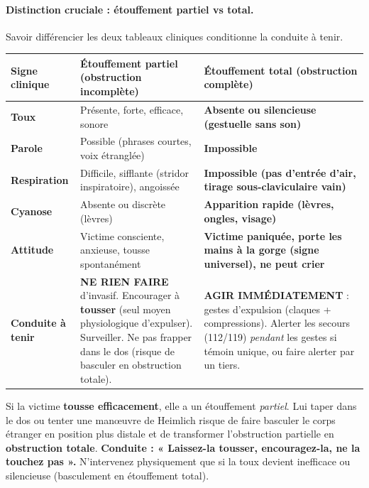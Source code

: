 \documentclass[11pt]{article}
\begin{document}
\paragraph{Distinction cruciale : étouffement partiel vs total.} Savoir différencier les deux tableaux cliniques conditionne la conduite à tenir.

\begin{center}
\begin{tabularx}{\linewidth}{|l|X|X|}
\hline
\rowcolor{popblueL}
\textbf{Signe clinique} & \textbf{Étouffement partiel (obstruction incomplète)} & \textbf{Étouffement total (obstruction complète)} \\
\hline
\textbf{Toux} & Présente, forte, efficace, sonore & \textbf{Absente ou silencieuse (gestuelle sans son)} \\
\hline
\textbf{Parole} & Possible (phrases courtes, voix étranglée) & \textbf{Impossible} \\
\hline
\textbf{Respiration} & Difficile, sifflante (stridor inspiratoire), angoissée & \textbf{Impossible (pas d'entrée d'air, tirage sous-claviculaire vain)} \\
\hline
\textbf{Cyanose} & Absente ou discrète (lèvres) & \textbf{Apparition rapide (lèvres, ongles, visage)} \\
\hline
\textbf{Attitude} & Victime consciente, anxieuse, tousse spontanément & \textbf{Victime paniquée, porte les mains à la gorge (signe universel), ne peut crier} \\
\hline
\textbf{Conduite à tenir} & \textbf{NE RIEN FAIRE} d'invasif. Encourager à \textbf{tousser} (seul moyen physiologique d'expulser). Surveiller. Ne pas frapper dans le dos (risque de basculer en obstruction totale). & \textbf{AGIR IMMÉDIATEMENT} : gestes d'expulsion (claques + compressions). Alerter les secours (112/119) \emph{pendant} les gestes si témoin unique, ou faire alerter par un tiers. \\
\hline
\end{tabularx}
\end{center}

\begin{attention}
Si la victime \textbf{tousse efficacement}, elle a un étouffement \emph{partiel}. Lui taper dans le dos ou tenter une manœuvre de Heimlich risque de faire basculer le corps étranger en position plus distale et de transformer l'obstruction partielle en \textbf{obstruction totale}. \textbf{Conduite : « Laissez-la tousser, encouragez-la, ne la touchez pas ».} N'intervenez physiquement que si la toux devient inefficace ou silencieuse (basculement en étouffement total).
\end{attention}
\end{document}
